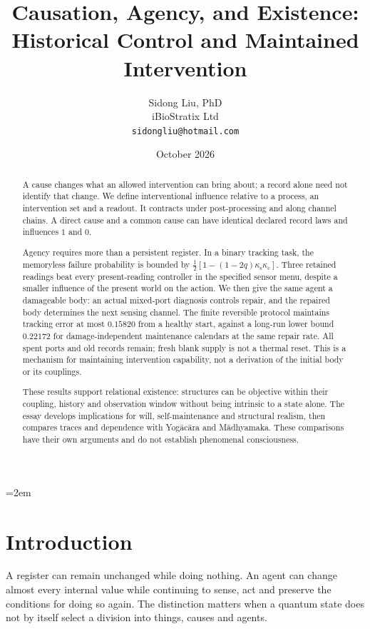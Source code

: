 \documentclass[11pt,a4paper]{article}
\title{Causation, Agency, and Existence:\\
Historical Control and Maintained Intervention}
\author{
  Sidong Liu, PhD \\
  iBioStratix Ltd \\
  \texttt{sidongliu@hotmail.com}
}
\date{October 2026}
\begin{document}
\emergencystretch=2em
\raggedbottom
{}

\maketitle

\begin{abstract}
A cause changes what an allowed intervention can bring about; a record alone
need not identify that change. We define interventional influence relative
to a process, an intervention set and a readout. It contracts under
post-processing and along channel chains. A direct cause and a common cause
can have identical declared record laws and influences \(1\) and \(0\).

Agency requires more than a persistent register. In a binary tracking task,
the memoryless failure probability is bounded by
\(\frac12[1-(1-2q)\kappa_{\mathrm s}\kappa_{\mathrm c}]\).
Three retained readings beat every present-reading controller in the
specified sensor menu, despite a smaller influence of the present world on
the action. We then give the same agent a damageable body: an actual
mixed-port diagnosis controls repair, and the repaired body determines the
next sensing channel. The finite reversible protocol maintains tracking
error at most \(0.15820\) from a healthy start, against a long-run lower bound
\(0.22172\) for damage-independent maintenance calendars at the same repair
rate. All spent ports and old records remain; fresh blank supply is not a
thermal reset. This is a mechanism for maintaining intervention capability,
not a derivation of the initial body or its couplings.

These results support relational existence: structures can be objective
within their coupling, history and observation window without being
intrinsic to a state alone. The essay develops implications for will,
self-maintenance and structural realism, then compares traces and
dependence with Yog\=ac\=ara and M\=adhyamaka. These comparisons have
their own arguments and do not establish phenomenal consciousness.

\end{abstract}

\tableofcontents

\section{Introduction}
\label{sec:intro}

A register can remain unchanged while doing nothing. An agent can change
almost every internal value while continuing to sense, act and preserve the
conditions for doing so again. The distinction matters when a quantum
state does not by itself select a division into things, causes and agents.
\end{document}
